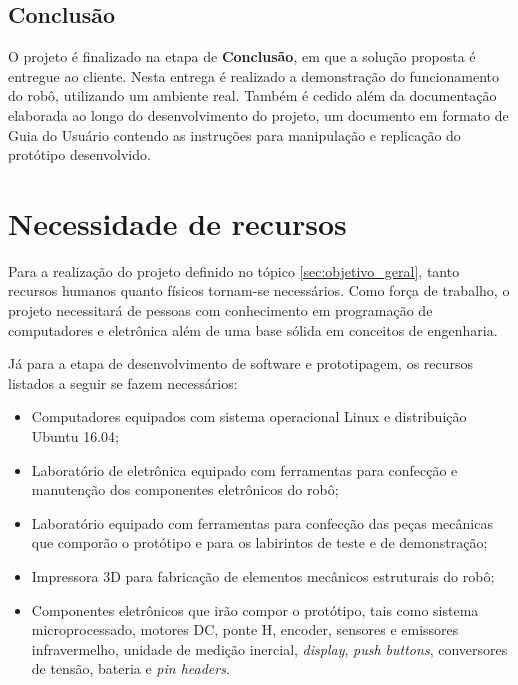 \subsection{Conclusão}
\label{metodologia_conclusao}
O projeto é finalizado na etapa de \textbf{Conclusão}, em que a solução proposta é entregue ao cliente. Nesta entrega é realizado a demonstração do funcionamento do robô, utilizando um ambiente real. Também é cedido além da documentação elaborada ao longo do desenvolvimento do projeto, um documento em formato de Guia do Usuário contendo as instruções para manipulação e replicação do protótipo desenvolvido.
        
\section{Necessidade de recursos}
Para a realização do projeto definido no tópico \ref{sec:objetivo_geral}, tanto recursos humanos quanto físicos tornam-se necessários. Como força de trabalho, o projeto necessitará de pessoas com conhecimento em programação de computadores e eletrônica além de uma base sólida em conceitos de engenharia. 

Já para a etapa de desenvolvimento de software e prototipagem, os recursos listados a seguir se fazem necessários:
\begin{itemize}
	\item Computadores equipados com sistema operacional Linux e distribuição Ubuntu 16.04;
	\item Laboratório de eletrônica equipado com ferramentas para confecção e manutenção dos componentes eletrônicos do robô;
	\item Laboratório equipado com ferramentas para confecção das peças mecânicas que comporão o protótipo e para os labirintos de teste e de demonstração;
	\item Impressora 3D para fabricação de elementos mecânicos estruturais do robô;
	\item Componentes eletrônicos que irão compor o protótipo, tais como sistema microprocessado, motores DC, ponte H, encoder, sensores e emissores infravermelho, unidade de medição inercial, \textit{display}, \textit{push buttons}, conversores de tensão, bateria e \textit{pin headers}. 
	 
\end{itemize}  


